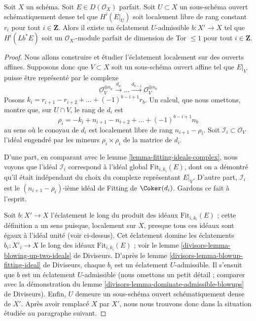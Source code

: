 \begin{lemma}
\label{lemma-blowup-complex}
Soit $X$ un schéma. Soit $E \in D(\mathcal{O}_X)$ parfait.
Soit $U \subset X$ un sous-schéma ouvert schématiquement dense
tel que $H^i(E|_U)$ soit localement libre de rang constant $r_i$
pour tout $i \in \mathbf{Z}$.
Alors il existe un éclatement $U$-admissible $b : X' \to X$ tel que
$H^i(Lb^*E)$ soit un $\mathcal{O}_{X'}$-module parfait
de dimension de Tor $\leq 1$ pour tout $i \in \mathbf{Z}$.
\end{lemma}

\begin{proof}
Nous allons construire et étudier l'éclatement localement sur des ouverts affines. Supposons donc que
$V \subset X$ soit un sous-schéma ouvert affine tel que
$E|_V$ puisse être représenté par le complexe
$$
\mathcal{O}_V^{\oplus n_a} \xrightarrow{d_a}
\ldots \xrightarrow{d_{b - 1}} \mathcal{O}_V^{\oplus n_b}
$$
Posons $k_ i = r_{i + 1} - r_{i + 2} + \ldots + (-1)^{b - i + 1}r_b$.
Un calcul, que nous omettons, montre que, sur $U \cap V$, le rang de
$d_i$ est
$$
\rho_i = - k_i + n_{i + 1} - n_{i + 2} + \ldots + (-1)^{b - i + 1}n_b
$$
au sens où le conoyau de $d_i$ est localement
libre de rang $n_{i + 1} - \rho_i$. Soit
$\mathcal{I}_i \subset \mathcal{O}_V$ l'idéal engendré par les mineurs
$\rho_i \times \rho_i$ de la matrice de $d_i$.

\medskip\noindent
D'une part, en comparant avec le lemme \ref{lemma-fitting-ideals-complex},
nous voyons que l'idéal $\mathcal{I}_i$ correspond à l'idéal global
$\text{Fit}_{i, k_i}(E)$, dont on a démontré qu'il était
indépendant du choix du complexe représentant $E|_V$.
D'autre part, $\mathcal{I}_i$ est le $(n_{i + 1} - \rho_i)$-ième
idéal de Fitting de $\Coker(d_i)$. Gardons ce fait à l'esprit.

\medskip\noindent
Soit $b : X' \to X$ l'éclatement le long du produit des idéaux
$\text{Fit}_{i, k_i}(E)$ ; cette définition a un sens puisque, localement sur $X$,
presque tous ces idéaux sont égaux à l'idéal unité (voir ci-dessus).
Cet éclatement domine les éclatements $b_i : X'_i \to X$ le long des
idéaux $\text{Fit}_{i, k_i}(E)$ ; voir
le lemme \ref{divisors-lemma-blowing-up-two-ideals} de Diviseurs.
D'après le lemme \ref{divisors-lemma-blowup-fitting-ideal} de Diviseurs,
chaque $b_i$ est un éclatement $U$-admissible. Il s'ensuit que
$b$ est un éclatement $U$-admissible (nous omettons un petit détail ; comparer avec
la démonstration du lemme \ref{divisors-lemma-dominate-admissible-blowups} de Diviseurs).
Enfin, $U$ demeure un sous-schéma ouvert schématiquement dense de $X'$.
Après avoir remplacé $X$ par $X'$, nous nous trouvons donc dans la situation
étudiée au paragraphe suivant.


\end{proof}
